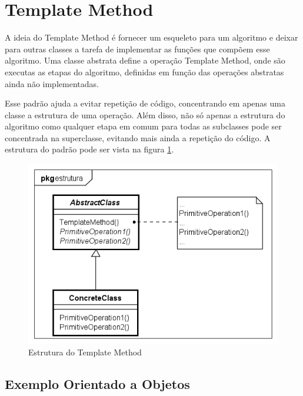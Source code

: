 \section{Template Method}

A ideia do Template Method é fornecer um esqueleto para um algoritmo 
e deixar para outras classes a tarefa de implementar as funções que 
compõem esse algoritmo. Uma classe abstrata define a operação Template 
Method, onde são executas as etapas do algoritmo, definidas em função 
das operações abstratas ainda não implementadas.\cite{gamma:1995}

Esse padrão ajuda a evitar repetição de código, concentrando 
em apenas uma classe a estrutura de uma operação. Além disso, 
não só apenas a estrutura do algoritmo como qualquer etapa em 
comum para todas as subclasses pode ser concentrada na superclasse, 
evitando mais ainda a repetição do código. A estrutura do padrão 
pode ser vista na figura \ref{tpmethod_struct}.

\begin{figure}[htb]
	\caption{\label{tpmethod_struct}Estrutura do Template Method}
	\begin{center}
	    \includegraphics[scale=0.5]{5_padroes-contexto-funcional/5.3_comportamentais/5.3.10_template-method/templatemethod_estrutura.png}
	\end{center}
\end{figure}

\subsection*{Exemplo Orientado a Objetos}

